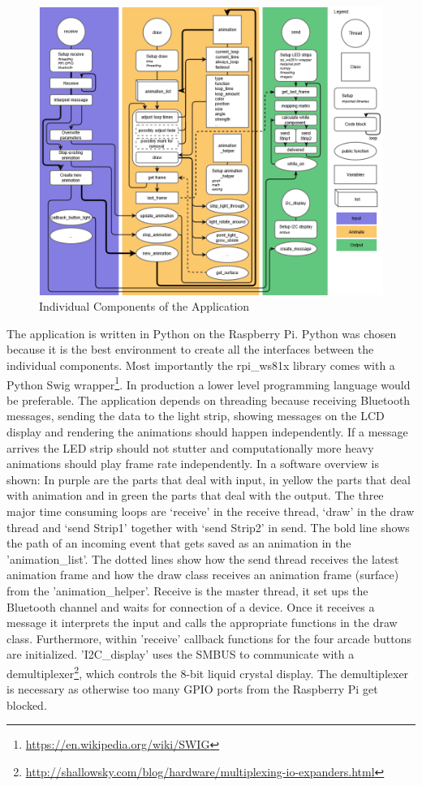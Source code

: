 \begin{figure}
\centering
    \includegraphics[width=1.12\textwidth]{fig/Flow.png}
    \caption[Software Diagram]{Individual Components of the Application}
    \label{fig:software}
\end{figure}
The application is written in Python on the Raspberry Pi. Python was chosen because it is the best environment to create all the interfaces between the individual components. Most importantly the rpi\_ws81x library comes with a Python Swig wrapper\footnote{\url{https://en.wikipedia.org/wiki/SWIG}}. In production a lower level programming language would be preferable. The application depends on threading because receiving Bluetooth messages, sending the data to the light strip, showing messages on the LCD display and rendering the animations should happen independently. If a message arrives the LED strip should not stutter and computationally more heavy animations should play frame rate independently. 
In \emph{} a software overview is shown: In purple are the parts that deal with input, in yellow the parts that deal with animation and in green the parts that deal with the output. The three major time consuming loops are ‘receive’ in the receive thread, ‘draw’ in the draw thread and ‘send Strip1’ together with ‘send Strip2’ in send. The bold line shows the path of an incoming event that gets saved as an animation in the 'animation\_list'. The dotted lines show how the send thread receives the latest animation frame and how the draw class receives an animation frame (surface) from the 'animation\_helper'. 
Receive is the master thread, it set ups the Bluetooth channel and waits for connection of a device. Once it receives a message it interprets the input and calls the appropriate functions in the draw class. Furthermore, within 'receive' callback functions for the four arcade buttons are initialized. 
'I2C\_display' uses the SMBUS to communicate with a demultiplexer\footnote{\url{http://shallowsky.com/blog/hardware/multiplexing-io-expanders.html}}, which controls the 8-bit liquid crystal display. The demultiplexer is necessary as otherwise too many GPIO ports from the Raspberry Pi get blocked. 

